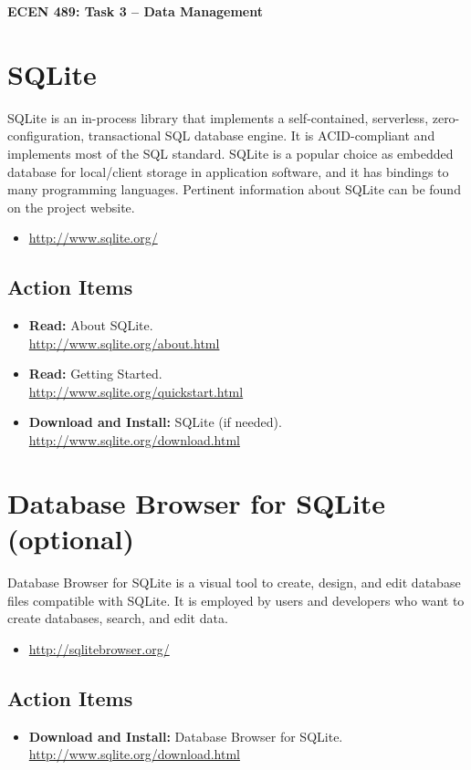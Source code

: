 \documentclass[11pt]{article}
\begin{document}
\begin{center}
{\bfseries \LARGE ECEN 489: Task 3 -- Data Management\\[8mm]}
\end{center}


\section{SQLite}

SQLite is an in-process library that implements a self-contained, serverless, zero-configuration, transactional SQL database engine.
It is ACID-compliant and implements most of the SQL standard.
SQLite is a popular choice as embedded database for local/client storage in application software, and it has bindings to many programming languages.
Pertinent information about SQLite can be found on the project website.
\begin{itemize}
\item \url{http://www.sqlite.org/}
\end{itemize}


\subsection*{Action Items}

\begin{itemize}
\item \textbf{Read:} About SQLite. \\
\url{http://www.sqlite.org/about.html}
\item \textbf{Read:} Getting Started. \\
\url{http://www.sqlite.org/quickstart.html}
\item \textbf{Download and Install:} SQLite (if needed). \\
\url{http://www.sqlite.org/download.html}
\end{itemize}


\section{Database Browser for SQLite (optional)}

Database Browser for SQLite is a visual tool to create, design, and edit database files compatible with SQLite.
It is employed by users and developers who want to create databases, search, and edit data.
\begin{itemize}
\item \url{http://sqlitebrowser.org/}
\end{itemize}

\subsection*{Action Items}

\begin{itemize}
\item \textbf{Download and Install:} Database Browser for SQLite. \\
\url{http://www.sqlite.org/download.html}
\end{itemize}
\end{document}
